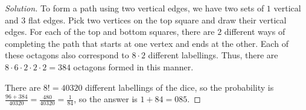 \begin{proof}[Solution]
To form a path using two vertical edges, we have two sets of $1$ vertical and
$3$ flat edges. Pick two vertices on the top square and draw their vertical
edges. For each of the top and bottom squares, there are $2$ different ways of
completing the path that starts at one vertex and ends at the other. Each of
these octagons also correspond to $8 \cdot 2$ different labellings. Thus, there
are $8 \cdot 6 \cdot 2 \cdot 2 \cdot 2 = 384$ octagons formed in this manner.

There are $8! = 40320$ different labellings of the dice, so the probability is
$\frac{96 + 384}{40320} = \frac{480}{40320} = \frac{1}{84}$, so the answer is $1
+ 84 = \boxed{085}$.
\end{proof}
\fi
